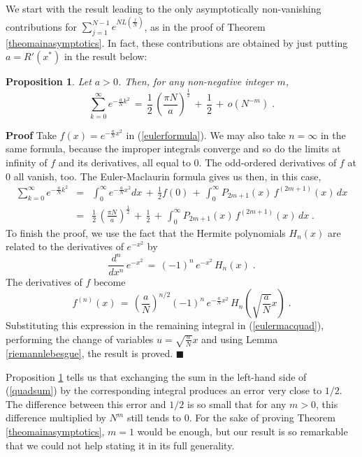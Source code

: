 \documentclass[12pt]{article}
\newtheorem{proposition}{Proposition}
\begin{document}
We start with the result leading to the only asymptotically non-vanishing contributions for $\sum_{j=1}^{N-1} e^{N L(\frac{j}{N})}$, as in the proof of Theorem \ref{theomainasymptotics}. In fact, these contributions are obtained by just putting $a= R'(x^{\ast})$ in the result below:
\begin{proposition}
\label{mainpart}
Let $a>0$. Then, for any non-negative integer $m$,
\begin{equation} \label{quadsum}
\sum_{k=0}^{\infty} e^{-\frac{a}{N}k^2} \,=\, \frac{1}{2}\, \left(\frac{\pi N}{a}\right)^\frac{1}{2} \,+\, \frac{1}{2} \,+\, o(N^{-m}) \;.
\end{equation}
\end{proposition}
\textbf{Proof}
Take $f(x)=e^{-\frac{a}{N}x^2}$ in (\ref{eulerformula}). We may also take $n=\infty$ in the same formula, because the improper integrals converge and so do the limits at infinity of $f$ and its derivatives, all equal to 0. The odd-ordered derivatives of $f$ at 0 all vanish, too. The Euler-Maclaurin formula gives us then, in this case,
\begin{eqnarray}
\sum_{k=0}^{\infty} e^{-\frac{a}{N}k^2} &=& \int_0^{\infty} e^{-\frac{a}{N}x^2} dx \,+\, \frac{1}{2} f(0)\,+\, \int_0^{\infty} P_{2m+1}(x)\, f^{(2m+1)}(x)\, dx \nonumber\\
&=&  \frac{1}{2}\, \left(\frac{\pi N}{a}\right)^\frac{1}{2} \,+\, \frac{1}{2} \,+\, \int_0^{\infty} P_{2m+1}(x)\, f^{(2m+1)}(x)\, dx \label{eulermacquad}\;.
\end{eqnarray}
To finish the proof, we use the fact that the Hermite polynomials $H_n(x)$ are related to the derivatives of $e^{-x^2}$ by
\[\frac{d^n}{dx^n} \,e^{-x^2} \,=\, (-1)^n \, e^{-x^2} \, H_n(x)\;.\]
The derivatives of $f$ become
\[f^{(n)}(x) \,=\, \left(\frac{a}{N}\right)^{n/2} (-1)^n \, e^{-\frac{a}{N}x^2} \, H_n(\sqrt{\frac{a}{N}}x)\;.\]
Substituting this expression in the remaining integral in (\ref{eulermacquad}), performing the change of variables $u=\sqrt{\frac{a}{N}}x$ and using Lemma \ref{riemannlebesgue}, the result is proved.
$\blacksquare$

Proposition \ref{mainpart} tells us that exchanging the sum in the left-hand side of (\ref{quadsum}) by the corresponding integral produces an error very close to $1/2$. The difference between this error and $1/2$ is so small that for any $m>0$, this difference multiplied by $N^m$ still tends to 0. For the sake of proving Theorem \ref{theomainasymptotics}, $m=1$ would be enough, but our result is so remarkable that we could not help stating it in its full generality.
\end{document}

